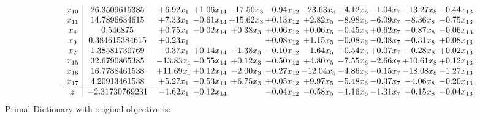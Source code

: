 \documentclass[9pt]{article}
\begin{document}
\[\begin{array}{c| c c@{\hskip 2pt} c@{\hskip 2pt} c@{\hskip 2pt} c@{\hskip 2pt} c@{\hskip 2pt} c@{\hskip 2pt} c@{\hskip 2pt} c@{\hskip 2pt} c@{\hskip 2pt} }
 x_{10}   &  26.3509615385 & +  6.92 x_{1} & +  1.06 x_{14} & -17.50 x_{3} & -0.94 x_{12} & -23.63 x_{5} & +  4.12 x_{6} & -1.04 x_{7} & -13.27 x_{8} & -0.44 x_{13}\\
 x_{11}   &  14.7896634615 & +  7.33 x_{1} & -0.61 x_{14} & + 15.62 x_{3} & +  0.13 x_{12} & +  2.82 x_{5} & -8.98 x_{6} & -6.09 x_{7} & -8.36 x_{8} & -0.75 x_{13}\\
 x_{4}   &  0.546875 & +  0.75 x_{1} & -0.02 x_{14} & +  0.38 x_{3} & +  0.06 x_{12} & +  0.06 x_{5} & -0.45 x_{6} & +  0.62 x_{7} & -0.87 x_{8} & -0.06 x_{13}\\
 x_{9}   &  0.384615384615 & +  0.23 x_{1} &    &   & +  0.08 x_{12} & +  1.15 x_{5} & +  0.08 x_{6} & -0.38 x_{7} & +  0.31 x_{8} & +  0.08 x_{13}\\
 x_{2}   &  1.38581730769 & -0.37 x_{1} & +  0.14 x_{14} & -1.38 x_{3} & -0.10 x_{12} & -1.64 x_{5} & +  0.54 x_{6} & +  0.07 x_{7} & -0.28 x_{8} & +  0.02 x_{13}\\
 x_{15}   &  32.6790865385 & -13.83 x_{1} & -0.55 x_{14} & +  0.12 x_{3} & -0.50 x_{12} & +  4.80 x_{5} & -7.55 x_{6} & -2.66 x_{7} & + 10.61 x_{8} & +  0.12 x_{13}\\
 x_{16}   &  16.7788461538 & + 11.69 x_{1} & +  0.12 x_{14} & -2.00 x_{3} & -0.27 x_{12} & -12.04 x_{5} & +  4.86 x_{6} & -0.15 x_{7} & -18.08 x_{8} & -1.27 x_{13}\\
 x_{17}   &  4.20913461538 & +  5.27 x_{1} & -0.53 x_{14} & +  6.75 x_{3} & +  0.05 x_{12} & +  9.97 x_{5} & -5.48 x_{6} & -0.37 x_{7} & -4.06 x_{8} & -0.20 x_{13}\\
\hline
z    &  -2.31730769231 & -1.62 x_{1} & -0.12 x_{14} &   & -0.04 x_{12} & -0.58 x_{5} & -1.16 x_{6} & -1.31 x_{7} & -0.15 x_{8} & -0.04 x_{13}\\
\end{array}\]
Primal Dictionary with original objective is:
\end{document}

